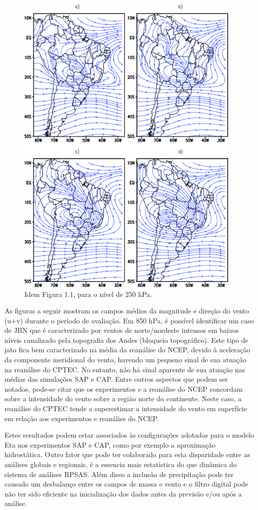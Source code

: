 \begin{figure}[!hbp]
\centering
\includegraphics[height=15cm]{./figs/media_corrente_anl_250hPa.png}
\caption{Idem Figura 1.1, para o nível de 250 hPa.}
\label{fig33}
\end{figure}

As figuras a seguir mostram os campos médios da magnitude e direção do vento (u+v) durante o período de avaliação. Em 850 hPa, é possível identificar um caso de JBN que é caracterizado por ventos de norte/nordeste intensos em baixos níveis canalizado pela topografia dos Andes (bloqueio topográfico). Este tipo de jato fica bem caracterizado na média da reanálise do NCEP, devido à aceleração da componente meridional do vento, havendo um pequeno sinal de sua atuação na reanálise do CPTEC. No entanto, não há sinal aparente de sua atuação nas médias das simulações SAP e CAP. Entre outros aspectos que podem ser notados, pode-se citar que os experimentos e a reanálise do NCEP concordam sobre a intensidade do vento sobre a região norte do continente. Neste caso, a reanálise do CPTEC tende a superestimar a intensidade do vento em superfície em relação aos experimentos e reanálise do NCEP. 

Estes resultados podem estar associados às configurações adotadas para o modelo Eta nos experimentos SAP e CAP, como por exemplo a aproximação hidrostática. Outro fator que pode ter colaborado para esta disparidade entre as análises globais e regionais, é a essencia mais estatística do que dinâmica do sistema de análises RPSAS. Além disso a inclusão de precipitação pode ter causado um desbalanço entre os campos de massa e vento e o filtro digital pode não ter sido eficiente na inicialização dos dados antes da previsão e/ou após a análise. 

